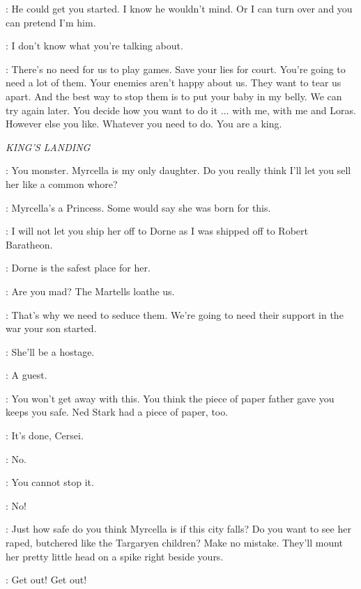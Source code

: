 \MARGAERY: He could get you started. I know he wouldn't mind. Or I can turn over and you can pretend I'm him. 

\RENLY: I don't know what you're talking about. 

\MARGAERY: There's no need for us to play games. Save your lies for court. You're going to need a lot of them. Your enemies aren't happy about us. They want to tear us apart. And the best way to stop them is to put your baby in my belly. We can try again later. You decide how you want to do it $\ldots$ with me, with me and Loras. However else you like. Whatever you need to do. You are a king. 


\scene

\textit{KING'S LANDING} 


\CERSEI: You monster. Myrcella is my only daughter. Do you really think I'll let you sell her like a common whore? 

\TYRION: Myrcella's a Princess. Some would say she was born for this. 

\CERSEI: I will not let you ship her off to Dorne as I was shipped off to Robert Baratheon. 

\TYRION: Dorne is the safest place for her. 

\CERSEI: Are you mad? The Martells loathe us. 

\TYRION: That's why we need to seduce them. We're going to need their support in the war your son started. 

\CERSEI: She'll be a hostage. 

\TYRION: A guest. 

\CERSEI: You won't get away with this. You think the piece of paper father gave you keeps you safe. Ned Stark had a piece of paper, too. 

\TYRION: It's done, Cersei. 

\CERSEI: No. 

\TYRION: You cannot stop it. 

\CERSEI: No! 


\TYRION: Just how safe do you think Myrcella is if this city falls? Do you want to see her raped, butchered like the Targaryen children? Make no mistake. They'll mount her pretty little head on a spike right beside yours. 

\CERSEI: Get out! Get out! 


\scene

